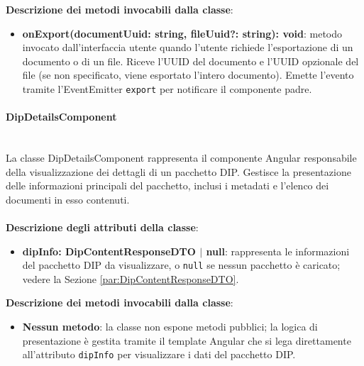 \documentclass[a4paper,12pt]{article}
\begin{document}
{{{{                \noindent \textbf{Descrizione dei metodi invocabili dalla classe}:
                \begin{itemize}
                    \item \textbf{onExport(documentUuid: string, fileUuid?: string): void}: metodo invocato dall'interfaccia utente quando l'utente richiede l'esportazione di un documento o di un file. Riceve l'UUID del documento e l'UUID opzionale del file (se non specificato, viene esportato l'intero documento). Emette l'evento tramite l'EventEmitter \texttt{export} per notificare il componente padre.
                \end{itemize}
                \paragraph{DipDetailsComponent}\label{par:DipDetailsComponent}\mbox{}\\
                La classe DipDetailsComponent rappresenta il componente Angular responsabile della visualizzazione dei dettagli di un pacchetto DIP. Gestisce la presentazione delle informazioni principali del pacchetto, inclusi i metadati e l'elenco dei documenti in esso contenuti.\\
                \\
                \textbf{Descrizione degli attributi della classe}:
                \begin{itemize}
                    \item \textbf{dipInfo: DipContentResponseDTO $|$ null}: rappresenta le informazioni del pacchetto DIP da visualizzare, o \texttt{null} se nessun pacchetto è caricato; vedere la Sezione \ref{par:DipContentResponseDTO}.
                \end{itemize}
                
                \noindent \textbf{Descrizione dei metodi invocabili dalla classe}:
                \begin{itemize}
                    \item \textbf{Nessun metodo}: la classe non espone metodi pubblici; la logica di presentazione è gestita tramite il template Angular che si lega direttamente all'attributo \texttt{dipInfo} per visualizzare i dati del pacchetto DIP.
                \end{itemize}
}}}}
\end{document}

